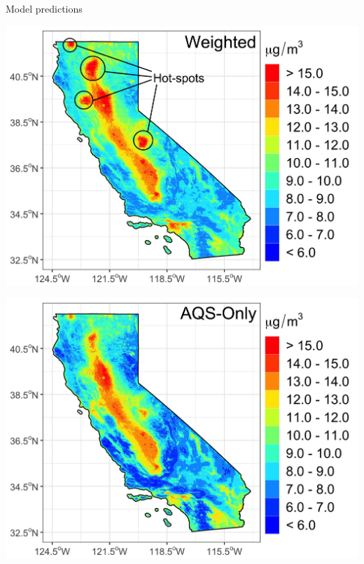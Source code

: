 \begin{frame}{Model predictions}
\begin{minipage}{0.44\textwidth}
    \begin{minipage}{\textwidth}
        \includegraphics[width=\textwidth]{img/w.jpg}
    \end{minipage}
    \begin{minipage}{\textwidth}
        \includegraphics[width=\textwidth]{img/aqs.jpg}
    \end{minipage}
\end{minipage}
\begin{minipage}{0.54\textwidth}

\end{minipage}
\end{frame}
